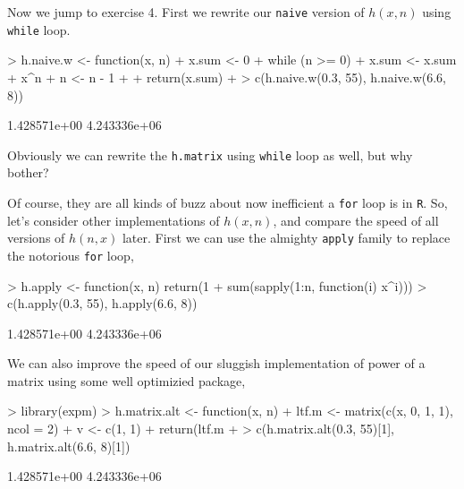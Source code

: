 \documentclass{article}
\begin{document}
Now we jump to exercise 4. First we rewrite our \verb=naive= version of $h(x, n)$ using \verb=while= loop.
\begin{Schunk}
\begin{Sinput}
> h.naive.w <- function(x, n) {
+     x.sum <- 0
+     while (n >= 0) {
+         x.sum <- x.sum + x^n
+         n <- n - 1
+     }
+     return(x.sum)
+ }
> c(h.naive.w(0.3, 55), h.naive.w(6.6, 8))
\end{Sinput}
\begin{Soutput}
[1] 1.428571e+00 4.243336e+06
\end{Soutput}
\end{Schunk}

Obviously we can rewrite the \verb=h.matrix= using \verb=while= loop as well, but why bother?

Of course, they are all kinds of buzz about now inefficient a \verb=for= loop is in \verb=R=. So, let's consider other implementations of $h(x, n)$, and compare the speed of all versions of $h(n, x)$ later.
First we can use the almighty \verb=apply= family to replace the notorious \verb=for= loop,
\begin{Schunk}
\begin{Sinput}
> h.apply <- function(x, n) return(1 + sum(sapply(1:n, function(i) x^i)))
> c(h.apply(0.3, 55), h.apply(6.6, 8))
\end{Sinput}
\begin{Soutput}
[1] 1.428571e+00 4.243336e+06
\end{Soutput}
\end{Schunk}

We can also improve the speed of our sluggish implementation of power of a matrix using some well optimizied package,
\begin{Schunk}
\begin{Sinput}
> library(expm)
> h.matrix.alt <- function(x, n) {
+     ltf.m <- matrix(c(x, 0, 1, 1), ncol = 2)
+     v <- c(1, 1)
+     return(ltf.m %^% n %*% v)
+ }
> c(h.matrix.alt(0.3, 55)[1], h.matrix.alt(6.6, 8)[1])
\end{Sinput}
\begin{Soutput}
[1] 1.428571e+00 4.243336e+06
\end{Soutput}
\end{Schunk}
\end{document}
